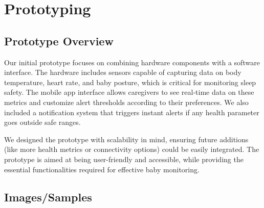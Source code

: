 \documentclass[12pt,a4paper]{report}
\begin{document}
\chapter{Prototyping}
\section{Prototype Overview}
Our initial prototype focuses on combining hardware components with a software interface. The hardware includes sensors capable of capturing data on body temperature, heart rate, and baby posture, which is critical for monitoring sleep safety. The mobile app interface allows caregivers to see real-time data on these metrics and customize alert thresholds according to their preferences. We also included a notification system that triggers instant alerts if any health parameter goes outside safe ranges.

We designed the prototype with scalability in mind, ensuring future additions (like more health metrics or connectivity options) could be easily integrated. The prototype is aimed at being user-friendly and accessible, while providing the essential functionalities required for effective baby monitoring.

\section{Images/Samples}
\end{document}

